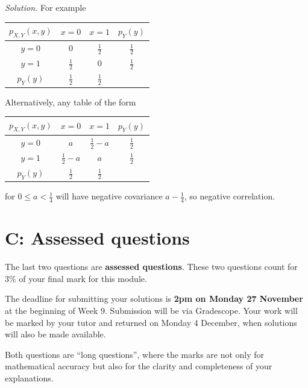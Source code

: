 \documentclass[
  a4paper,
]{book}
\theoremstyle{definition}
\theoremstyle{definition}
\theoremstyle{definition}
\theoremstyle{definition}
\theoremstyle{remark}
\begin{document}
\begin{myanswers}
\emph{Solution.} For example

\begin{longtable}[]{@{}cccc@{}}
\toprule()
\(p_{X,Y}(x,y)\) & \(x = 0\) & \(x = 1\) & \(p_Y(y)\) \\
\midrule()
\endhead
\(y = 0\) & \(0\) & \(\frac12\) & \(\frac12\) \\
\(y = 1\) & \(\frac12\) & \(0\) & \(\frac12\) \\
\(p_Y(y)\) & \(\frac12\) & \(\frac12\) & \\
\bottomrule()
\end{longtable}

Alternatively, any table of the form

\begin{longtable}[]{@{}cccc@{}}
\toprule()
\(p_{X,Y}(x,y)\) & \(x = 0\) & \(x = 1\) & \(p_Y(y)\) \\
\midrule()
\endhead
\(y = 0\) & \(a\) & \(\frac12 - a\) & \(\frac12\) \\
\(y = 1\) & \(\frac12 - a\) & \(a\) & \(\frac12\) \\
\(p_Y(y)\) & \(\frac12\) & \(\frac12\) & \\
\bottomrule()
\end{longtable}

for \(0 \leq a < \frac14\) will have negative covariance \(a - \frac14\), so negative correlation.

\end{myanswers}

\hypertarget{P4-assessed}{%
\section*{C: Assessed questions}\label{P4-assessed}}

The last two questions are \textbf{assessed questions}. These two questions count for 3\% of your final mark for this module.

The deadline for submitting your solutions is \textbf{2pm on Monday 27 November} at the beginning of Week 9. Submission will be via Gradescope.
Your work will be marked by your tutor and returned on Monday 4 December, when solutions will also be made available.

Both questions are ``long questions'', where the marks are not only for mathematical accuracy but also for the clarity and completeness of your explanations.
\end{document}
